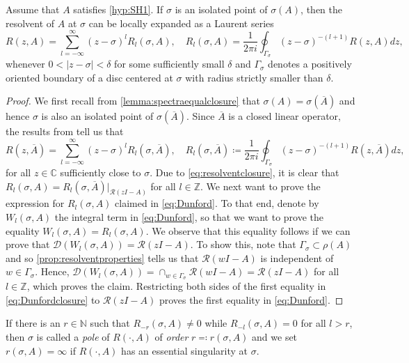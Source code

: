 \documentclass[english]{myarticle}
\begin{document}
\begin{sloppypar}
\begin{lemma} \label{lemma:Dunford}
Assume that $A$ satisfies \ref{hyp:SH1}. If $\sigma$ is an isolated point of $\sigma(A)$, then the resolvent of $A$ at $\sigma$ can be locally expanded as a Laurent series
\begin{equation} \label{eq:Dunford}
    R(z,A) = \sum_{l = -\infty}^{\infty} (z - \sigma)^l R_l(\sigma,A), \quad R_l(\sigma,A) = \frac{1}{2 \pi i} \oint_{\Gamma_{\sigma}} (z-\sigma)^{-(l+1)}R(z,A) dz,
\end{equation}
whenever $0 < |z-\sigma| < \delta$ for some sufficiently small $\delta$ and $\Gamma_{\sigma}$ denotes a positively oriented boundary of a disc centered at $\sigma$ with radius strictly smaller than $\delta$. 
\end{lemma}
\begin{proof}
We first recall from \cref{lemma:spectraequalclosure} that $\sigma(A) = \sigma(\overline{A})$ and hence $\sigma$ is also an isolated point of $\sigma(\overline{A})$. Since $\overline{A}$ is a closed linear operator, the results from \cite[Section IV.1.17]{Engel2000} tell us that
\begin{equation} \label{eq:Dunfordclosure}
    R(z,\overline{A}) = \sum_{l = -\infty}^{\infty} (z - \sigma)^l R_l(\sigma,\overline{A}), \quad R_l(\sigma,\overline{A}) \coloneqq \frac{1}{2 \pi i} \oint_{\Gamma_{\sigma}} (z-\sigma)^{-(l+1)}R(z,\overline{A}) dz,
\end{equation}
for all $z \in \mathbb{C}$ sufficiently close to $\sigma$. Due to \eqref{eq:resolventclosure}, it is clear that $R_l(\sigma,A) = R_l(\sigma,\overline{A})|_{\mathcal{R}(zI-A)}$ for all $l \in \mathbb{Z}$. We next want to prove the expression for $R_l(\sigma, A)$ claimed in \eqref{eq:Dunford}. To that end, denote by $W_l(\sigma,A)$ the integral term in \eqref{eq:Dunford}, so that we want to prove the equality $W_l(\sigma, A) = R_l(\sigma, A)$. We observe that this equality follows
if we can prove that $\mathcal{D}(W_l(\sigma,A)) = \mathcal{R}(zI-A)$. To show this, note that $\Gamma_\sigma \subset \rho(A)$ and so \cref{prop:resolventproperties} tells us that $\mathcal{R}(wI - A)$ is independent of $w \in \Gamma_\sigma$. Hence, $\mathcal{D}(W_l(\sigma,A)) = \cap_{w \in \Gamma_\sigma} \mathcal{R}(wI-A) = \mathcal{R}(zI-A)$ for all $l \in \mathbb{Z}$, which proves the claim. Restricting both sides of the first equality in \eqref{eq:Dunfordclosure} to $\mathcal{R}(zI-A)$ proves the first equality in \eqref{eq:Dunford}.
\end{proof}
If there is an $r \in \mathbb{N}$ such that $R_{-r}(\sigma,A) \neq 0$ while $R_{-l}(\sigma,A) = 0$ for all $l > r$, then $\sigma$ is called a \emph{pole} of $R(\cdot,A)$ of \emph{order} $r \eqqcolon r(\sigma,A)$ and we set $r(\sigma,A) = \infty$ if $R(\cdot,A)$ has an essential singularity at $\sigma$.


\end{sloppypar}
\end{document}
